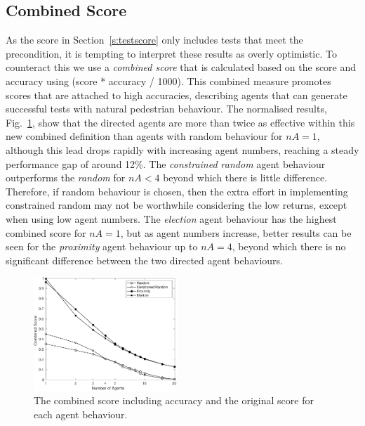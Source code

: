\documentclass[letterpaper, 10 pt, journal, twoside]{IEEEtran}
\begin{document}
\subsection{Combined Score}
As the score in Section~\ref{s:testscore} only includes tests that meet the precondition, it is tempting to interpret these results as overly optimistic. To counteract this we use a \textit{combined score} that is calculated based on the score and accuracy using (score * accuracy / 1000). This combined measure promotes scores that are attached to high accuracies, describing agents that can generate successful tests with natural pedestrian behaviour. %
%
The normalised results, Fig.~\ref{f:combined}, show that the directed agents are more than twice as effective within this new combined definition than agents with random behaviour for $nA=1$, although this lead drops rapidly with increasing agent numbers, reaching a steady performance gap of around 12\%.
%
The \textit{constrained random} agent behaviour outperforms the \textit{random} for $nA<4$ beyond which there is little difference. Therefore, if random behaviour is chosen, then the extra effort in implementing constrained random may not be worthwhile considering the low returns, except when using low agent numbers.
%
The \textit{election} agent behaviour has the highest combined score for $nA=1$, but as agent numbers increase, better results can be seen for the \textit{proximity} agent behaviour up to $nA=4$, beyond which there is no significant difference between the two directed agent behaviours.
%

\begin{figure}[!t]
	\centering
\includegraphics[width=0.48\textwidth]{Combined.pdf}
	\caption{The combined score including accuracy and the original score for each agent behaviour.}
	\label{f:combined}
\end{figure}
\end{document}
